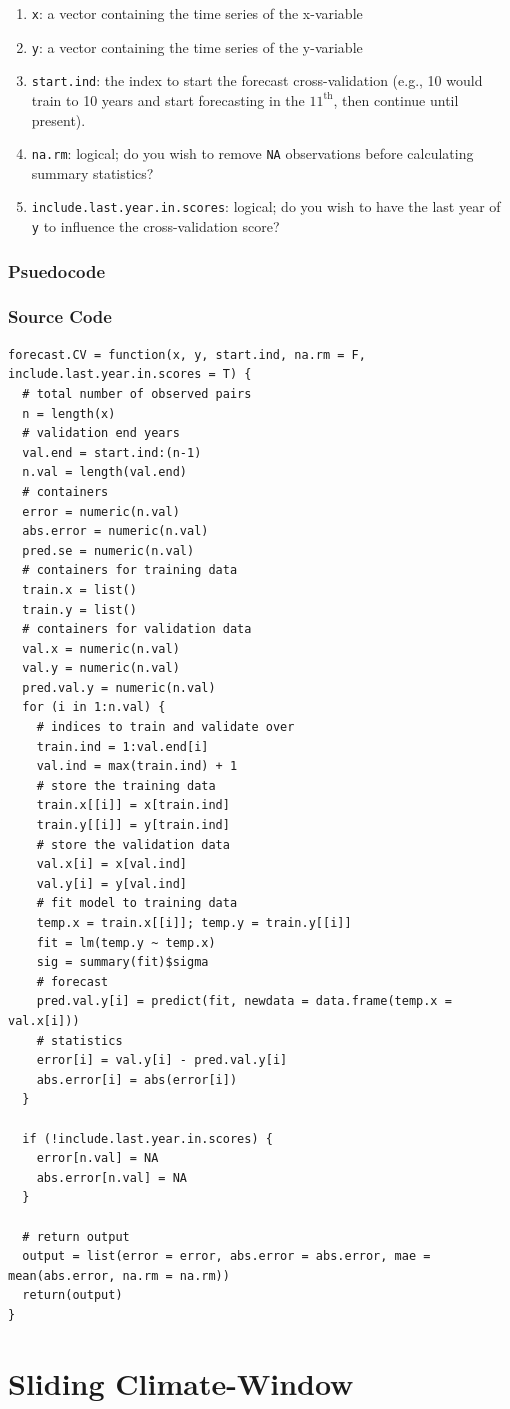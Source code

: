 \documentclass[12pt,]{book}
\providecommand{\tightlist}{%
  \setlength{\itemsep}{0pt}\setlength{\parskip}{0pt}}
\theoremstyle{definition}
\theoremstyle{definition}
\theoremstyle{definition}
\theoremstyle{remark}
\begin{document}
\begin{enumerate}
\def\labelenumi{\arabic{enumi}.}
\tightlist
\item
  \texttt{x}: a vector containing the time series of the x-variable
\item
  \texttt{y}: a vector containing the time series of the y-variable
\item
  \texttt{start.ind}: the index to start the forecast cross-validation
  (e.g., 10 would train to 10 years and start forecasting in the
  \(11^{\text{th}}\), then continue until present).
\item
  \texttt{na.rm}: logical; do you wish to remove \texttt{NA}
  observations before calculating summary statistics?
\item
  \texttt{include.last.year.in.scores}: logical; do you wish to have the
  last year of \texttt{y} to influence the cross-validation score?
\end{enumerate}

\subsubsection*{Psuedocode}\label{psuedocode}

\subsubsection*{Source Code}\label{source-code}

\begin{verbatim}
forecast.CV = function(x, y, start.ind, na.rm = F, include.last.year.in.scores = T) {  
  # total number of observed pairs
  n = length(x)
  # validation end years
  val.end = start.ind:(n-1)
  n.val = length(val.end)
  # containers
  error = numeric(n.val)
  abs.error = numeric(n.val)
  pred.se = numeric(n.val)
  # containers for training data
  train.x = list()
  train.y = list()
  # containers for validation data
  val.x = numeric(n.val)
  val.y = numeric(n.val)
  pred.val.y = numeric(n.val)
  for (i in 1:n.val) {
    # indices to train and validate over
    train.ind = 1:val.end[i]
    val.ind = max(train.ind) + 1
    # store the training data
    train.x[[i]] = x[train.ind]
    train.y[[i]] = y[train.ind]
    # store the validation data
    val.x[i] = x[val.ind]
    val.y[i] = y[val.ind]
    # fit model to training data
    temp.x = train.x[[i]]; temp.y = train.y[[i]]
    fit = lm(temp.y ~ temp.x)
    sig = summary(fit)$sigma
    # forecast
    pred.val.y[i] = predict(fit, newdata = data.frame(temp.x = val.x[i]))
    # statistics
    error[i] = val.y[i] - pred.val.y[i]
    abs.error[i] = abs(error[i])
  }
  
  if (!include.last.year.in.scores) {
    error[n.val] = NA
    abs.error[n.val] = NA
  } 
  
  # return output
  output = list(error = error, abs.error = abs.error, mae = mean(abs.error, na.rm = na.rm))
  return(output)
}
\end{verbatim}

\section*{Sliding Climate-Window}\label{sliding-climate-window}

\setlength{\parskip}{6pt plus 2pt minus 1pt}


\end{document}
